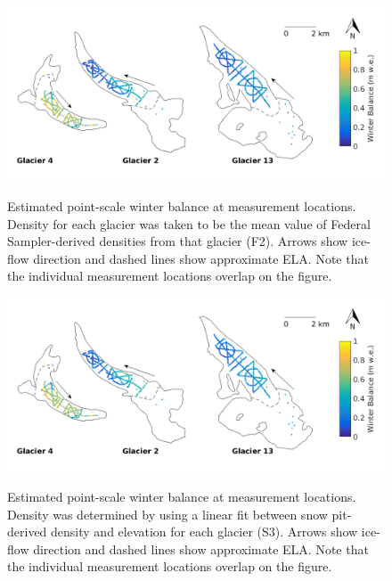 \documentclass{sfuthesis}
\begin{document}
\begin{figure}[H]
	\centering
	\includegraphics[width = \textwidth]{SWEmap_opt5.png}\\
	\caption{Estimated point-scale winter balance at measurement locations. Density for each glacier was taken to be the mean value of Federal Sampler-derived densities from that glacier (F2). Arrows show ice-flow direction and dashed lines show approximate ELA. Note that the individual measurement locations overlap on the figure.}
	\label{fig:SWEmap_F2}
\end{figure}

\begin{figure}[H]
	\centering
	\includegraphics[width = \textwidth]{SWEmap_opt6.png}\\
	\caption{Estimated point-scale winter balance at measurement locations. Density was determined by using a linear fit between snow pit-derived density and elevation for each glacier (S3). Arrows show ice-flow direction and dashed lines show approximate ELA. Note that the individual measurement locations overlap on the figure.}
	\label{fig:SWEmap_S3}
\end{figure}
\end{document}
